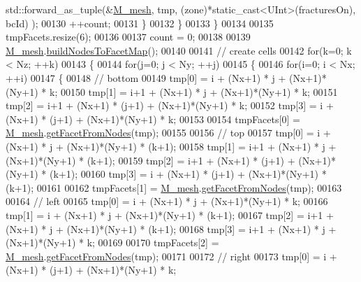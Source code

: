 \begin{DoxyCode}
      std::forward\_as\_tuple(&\hyperlink{classFVCode3D_1_1CartesianGrid_a40c64e663b3d2de02b852403c75495fb}{M\_mesh}, tmp, (zone)*static\_cast<UInt>(fracturesOn), bcId) );
00130                 ++count;
00131             \}
00132         \}
00133     \}
00134 
00135     tmpFacets.resize(6);
00136 
00137     count = 0;
00138 
00139     \hyperlink{classFVCode3D_1_1CartesianGrid_a40c64e663b3d2de02b852403c75495fb}{M\_mesh}.\hyperlink{classFVCode3D_1_1Mesh3D_a609f980329f5a98e9fad724049e509d2}{buildNodesToFacetMap}();
00140 
00141     \textcolor{comment}{// create cells}
00142     \textcolor{keywordflow}{for}(k=0; k < Nz; ++k)
00143     \{
00144         \textcolor{keywordflow}{for}(j=0; j < Ny; ++j)
00145         \{
00146             \textcolor{keywordflow}{for}(i=0; i < Nx; ++i)
00147             \{
00148                 \textcolor{comment}{// bottom}
00149                 tmp[0] = i + (Nx+1) * j + (Nx+1)*(Ny+1) * k;
00150                 tmp[1] = i+1 + (Nx+1) * j + (Nx+1)*(Ny+1) * k;
00151                 tmp[2] = i+1 + (Nx+1) * (j+1) + (Nx+1)*(Ny+1) * k;
00152                 tmp[3] = i + (Nx+1) * (j+1) + (Nx+1)*(Ny+1) * k;
00153 
00154                 tmpFacets[0] = \hyperlink{classFVCode3D_1_1CartesianGrid_a40c64e663b3d2de02b852403c75495fb}{M\_mesh}.\hyperlink{classFVCode3D_1_1Mesh3D_a2ac0b84c13a15ed42cdd8c98066eae98}{getFacetFromNodes}(tmp);
00155 
00156                 \textcolor{comment}{// top}
00157                 tmp[0] = i + (Nx+1) * j + (Nx+1)*(Ny+1) * (k+1);
00158                 tmp[1] = i+1 + (Nx+1) * j + (Nx+1)*(Ny+1) * (k+1);
00159                 tmp[2] = i+1 + (Nx+1) * (j+1) + (Nx+1)*(Ny+1) * (k+1);
00160                 tmp[3] = i + (Nx+1) * (j+1) + (Nx+1)*(Ny+1) * (k+1);
00161 
00162                 tmpFacets[1] = \hyperlink{classFVCode3D_1_1CartesianGrid_a40c64e663b3d2de02b852403c75495fb}{M\_mesh}.\hyperlink{classFVCode3D_1_1Mesh3D_a2ac0b84c13a15ed42cdd8c98066eae98}{getFacetFromNodes}(tmp);
00163 
00164                 \textcolor{comment}{// left}
00165                 tmp[0] = i + (Nx+1) * j + (Nx+1)*(Ny+1) * k;
00166                 tmp[1] = i + (Nx+1) * j + (Nx+1)*(Ny+1) * (k+1);
00167                 tmp[2] = i+1 + (Nx+1) * j + (Nx+1)*(Ny+1) * (k+1);
00168                 tmp[3] = i+1 + (Nx+1) * j + (Nx+1)*(Ny+1) * k;
00169 
00170                 tmpFacets[2] = \hyperlink{classFVCode3D_1_1CartesianGrid_a40c64e663b3d2de02b852403c75495fb}{M\_mesh}.\hyperlink{classFVCode3D_1_1Mesh3D_a2ac0b84c13a15ed42cdd8c98066eae98}{getFacetFromNodes}(tmp);
00171 
00172                 \textcolor{comment}{// right}
00173                 tmp[0] = i + (Nx+1) * (j+1) + (Nx+1)*(Ny+1) * k;

\end{DoxyCode}
